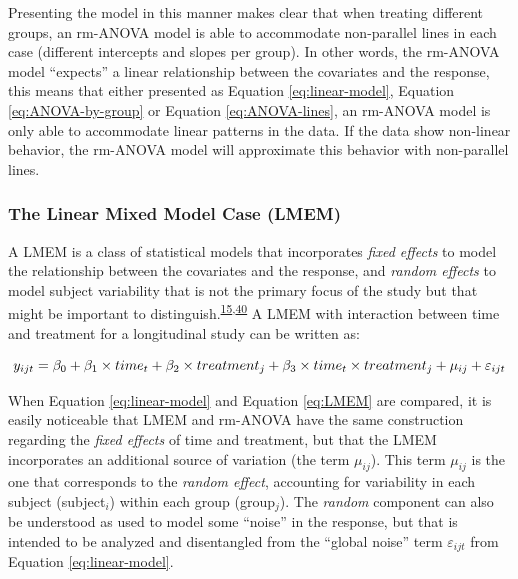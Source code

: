 \documentclass[
]{article}
\begin{document}
Presenting the model in this manner makes clear that when treating different groups, an rm-ANOVA model is able to accommodate non-parallel lines in each case (different intercepts and slopes per group). In other words, the rm-ANOVA model ``expects'' a linear relationship between the covariates and the response, this means that either presented as Equation \eqref{eq:linear-model}, Equation \eqref{eq:ANOVA-by-group} or Equation \eqref{eq:ANOVA-lines}, an rm-ANOVA model is only able to accommodate linear patterns in the data. If the data show non-linear behavior, the rm-ANOVA model will approximate this behavior with non-parallel lines.

\hypertarget{the-linear-mixed-model-case-lmem}{%
\subsubsection{The Linear Mixed Model Case (LMEM)}\label{the-linear-mixed-model-case-lmem}}

A LMEM is a class of statistical models that incorporates \emph{fixed effects} to model the relationship between the covariates and the response, and \emph{random effects} to model subject variability that is not the primary focus of the study but that might be important to distinguish.\textsuperscript{\protect\hyperlink{ref-pinheiro2006}{15},\protect\hyperlink{ref-west2014}{40}} A LMEM with interaction between time and treatment for a longitudinal study can be written as:

\begin{equation}
y_{ijt} = \beta_0+ \beta_1 \times time_{t} + \beta_2 \times treatment_{j} + \beta_3 \times time_{t}\times treatment_{j}+\mu_{ij} +\varepsilon_{ijt}\\ 
\label{eq:LMEM}
\end{equation}

When Equation \eqref{eq:linear-model} and Equation \eqref{eq:LMEM} are compared, it is easily noticeable that LMEM and rm-ANOVA have the same construction regarding the \emph{fixed effects} of time and treatment, but that the LMEM incorporates an additional source of variation (the term \(\mu_{ij}\)). This term \(\mu_{ij}\) is the one that corresponds to the \emph{random effect}, accounting for variability in each subject (subject\(_i\)) within each group (group\(_j\)). The \emph{random} component can also be understood as used to model some ``noise'' in the response, but that is intended to be analyzed and disentangled from the ``global noise'' term \(\varepsilon_{ijt}\) from Equation \eqref{eq:linear-model}.
\end{document}
